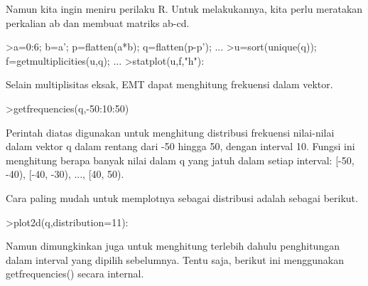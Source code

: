 \documentclass{article}
\begin{document}
\begin{eulernotebook}
\begin{eulercomment}
\begin{eulercomment}
\begin{eulercomment}
\begin{eulercomment}
\begin{eulercomment}
\begin{eulercomment}
\begin{eulercomment}
\begin{eulercomment}
\begin{eulercomment}
\begin{eulercomment}
\begin{eulercomment}
Namun kita ingin meniru perilaku R. Untuk melakukannya, kita perlu
meratakan perkalian ab dan membuat matriks ab-cd.
\end{eulercomment}
\begin{eulerprompt}
>a=0:6; b=a'; p=flatten(a*b); q=flatten(p-p'); ...
>u=sort(unique(q)); f=getmultiplicities(u,q); ...
>statplot(u,f,"h"):
\end{eulerprompt}
\begin{eulercomment}
Selain multiplisitas eksak, EMT dapat menghitung frekuensi dalam
vektor.
\end{eulercomment}
\begin{eulerprompt}
>getfrequencies(q,-50:10:50)
\end{eulerprompt}
\begin{euleroutput}
  [0,  23,  132,  316,  602,  801,  333,  141,  53,  0]
\end{euleroutput}
\begin{eulercomment}
Perintah diatas digunakan untuk menghitung distribusi frekuensi
nilai-nilai dalam vektor q dalam rentang dari -50 hingga 50, dengan
interval 10. Fungsi ini menghitung berapa banyak nilai dalam q yang
jatuh dalam setiap interval: [-50, -40), [-40, -30), ..., [40, 50).

Cara paling mudah untuk memplotnya sebagai distribusi adalah sebagai
berikut.
\end{eulercomment}
\begin{eulerprompt}
>plot2d(q,distribution=11):
\end{eulerprompt}
\begin{eulercomment}
Namun dimungkinkan juga untuk menghitung terlebih dahulu penghitungan
dalam interval yang dipilih sebelumnya. Tentu saja, berikut ini
menggunakan getfrequencies() secara internal.


\end{eulercomment}
\end{eulercomment}
\end{eulercomment}
\end{eulercomment}
\end{eulercomment}
\end{eulercomment}
\end{eulercomment}
\end{eulercomment}
\end{eulercomment}
\end{eulercomment}
\end{eulercomment}
\end{eulernotebook}
\end{document}
